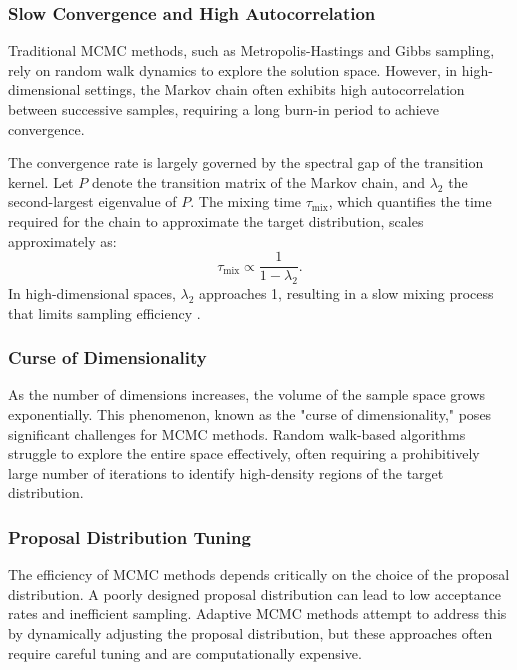 \documentclass[twocolumn]{article}
\begin{document}
\subsubsection{Slow Convergence and High Autocorrelation}

Traditional MCMC methods, such as Metropolis-Hastings and Gibbs sampling, rely on random walk dynamics to explore the solution space. However, in high-dimensional settings, the Markov chain often exhibits high autocorrelation between successive samples, requiring a long burn-in period to achieve convergence.

The convergence rate is largely governed by the spectral gap of the transition kernel. Let $P$ denote the transition matrix of the Markov chain, and $\lambda_2$ the second-largest eigenvalue of $P$. The mixing time $\tau_{\text{mix}}$, which quantifies the time required for the chain to approximate the target distribution, scales approximately as:
\[
\tau_{\text{mix}} \propto \frac{1}{1 - \lambda_2}.
\]
In high-dimensional spaces, $\lambda_2$ approaches 1, resulting in a slow mixing process that limits sampling efficiency \citep{robert2004monte}.

\subsubsection{Curse of Dimensionality}

As the number of dimensions increases, the volume of the sample space grows exponentially. This phenomenon, known as the "curse of dimensionality," poses significant challenges for MCMC methods. Random walk-based algorithms struggle to explore the entire space effectively, often requiring a prohibitively large number of iterations to identify high-density regions of the target distribution.

\subsubsection{Proposal Distribution Tuning}

The efficiency of MCMC methods depends critically on the choice of the proposal distribution. A poorly designed proposal distribution can lead to low acceptance rates and inefficient sampling. Adaptive MCMC methods attempt to address this by dynamically adjusting the proposal distribution, but these approaches often require careful tuning and are computationally expensive.
\end{document}
